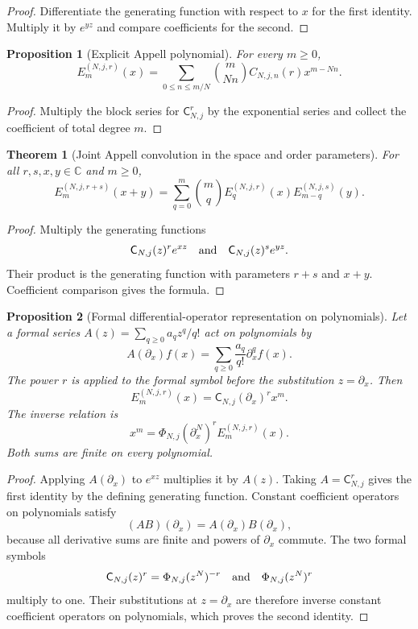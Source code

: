 \documentclass[11pt]{article}
\newtheorem{theorem}{Theorem}[section]
\newtheorem{proposition}[proposition]{Proposition}
\theoremstyle{definition}
\theoremstyle{remark}
\newcommand{\CC}{\mathbb C}
\newcommand{\Cfun}{\mathsf C}
\begin{document}
\begin{proof}
Differentiate the generating function with respect to $x$ for the first identity.  Multiply it by $e^{yz}$ and compare coefficients for the second.
\end{proof}

\begin{proposition}[Explicit Appell polynomial]\label{prop:explicit_appell}
For every $m\geq0$,
\[
E_m^{(N,j,r)}(x)
=
\sum_{0\leq n\leq m/N}
\binom{m}{Nn}
C_{N,j,n}(r)x^{m-Nn}.
\]
\end{proposition}

\begin{proof}
Multiply the block series for $\Cfun_{N,j}^r$ by the exponential series and collect the coefficient of total degree $m$.
\end{proof}


\begin{theorem}[Joint Appell convolution in the space and order parameters]\label{thm:appell_two_parameter_convolution}
For all $r,s,x,y\in\CC$ and $m\geq0$,
\[
E_m^{(N,j,r+s)}(x+y)
=
\sum_{q=0}^{m}
\binom mq
E_q^{(N,j,r)}(x)
E_{m-q}^{(N,j,s)}(y).
\]
\end{theorem}

\begin{proof}
Multiply the generating functions
\[
\Cfun_{N,j}(z)^re^{xz}
\quad\hbox{and}\quad
\Cfun_{N,j}(z)^se^{yz}.
\]
Their product is the generating function with parameters $r+s$ and $x+y$.  Coefficient comparison gives the formula.
\end{proof}

\begin{proposition}[Formal differential-operator representation on polynomials]\label{prop:appell_operator_form}
Let a formal series $A(z)=\sum_{q\geq0}a_qz^q/q!$ act on polynomials by
\[
A(\partial_x)f(x)
=
\sum_{q\geq0}\frac{a_q}{q!}\partial_x^qf(x).
\]
The power $r$ is applied to the formal symbol before the substitution $z=\partial_x$.  Then
\[
E_m^{(N,j,r)}(x)
=
\Cfun_{N,j}(\partial_x)^r x^m.
\]
The inverse relation is
\[
x^m
=
\Phi_{N,j}(\partial_x^N)^r
E_m^{(N,j,r)}(x).
\]
Both sums are finite on every polynomial.
\end{proposition}

\begin{proof}
Applying $A(\partial_x)$ to $e^{xz}$ multiplies it by $A(z)$.  Taking
$A=\Cfun_{N,j}^r$ gives the first identity by the defining generating
function.  Constant coefficient operators on polynomials satisfy
\[
(AB)(\partial_x)=A(\partial_x)B(\partial_x),
\]
because all derivative sums are finite and powers of $\partial_x$
commute.  The two formal symbols
\[
\Cfun_{N,j}(z)^r=\Phi_{N,j}(z^N)^{-r}
\quad\hbox{and}\quad
\Phi_{N,j}(z^N)^r
\]
multiply to one.  Their substitutions at $z=\partial_x$ are therefore
inverse constant coefficient operators on polynomials, which proves
the second identity.
\end{proof}
\end{document}
